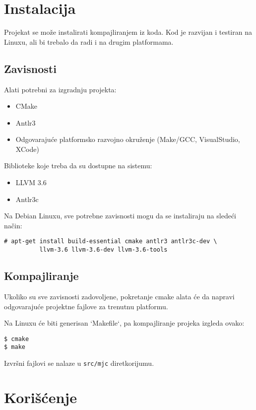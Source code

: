 \section{Instalacija}

Projekat se može instalirati kompajliranjem iz koda. Kod je razvijan i testiran
na Linuxu, ali bi trebalo da radi i na drugim platformama.

\subsection*{Zavisnosti}

Alati potrebni za izgradnju projekta:
\begin{itemize}
\item CMake
\item Antlr3
\item Odgovarajuće platformsko razvojno okruženje (Make/GCC, VisualStudio, XCode)
\end{itemize}

Biblioteke koje treba da su dostupne na sistemu:
\begin{itemize}
\item LLVM 3.6
\item Antlr3c
\end{itemize}

Na Debian Linuxu, sve potrebne zavisnosti mogu da se instaliraju na sledeći način:

\begin{lstlisting}
# apt-get install build-essential cmake antlr3 antlr3c-dev \
          llvm-3.6 llvm-3.6-dev llvm-3.6-tools
\end{lstlisting}

\subsection*{Kompajliranje}

Ukoliko su sve zavisnosti zadovoljene, pokretanje cmake alata će da napravi
odgovarajuće projektne fajlove za trenutnu platformu.

Na Linuxu će biti generisan `Makefile`, pa kompajliranje projeka izgleda ovako:

\begin{lstlisting}
$ cmake
$ make
\end{lstlisting}

Izvršni fajlovi se nalaze u \texttt{src/mjc} diretkorijumu.

\section{Korišćenje}

